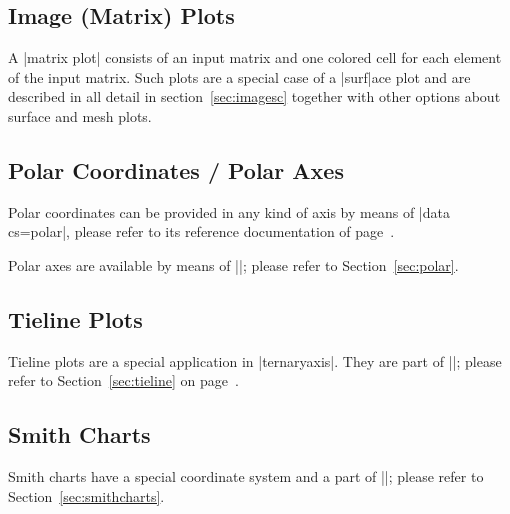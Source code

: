 {\label{sec:pgfplots:2d:patch}

\subsection{Image (Matrix) Plots}

A |matrix plot| consists of an input matrix and one colored cell for each element of the input matrix. Such plots are a special case of a |surf|ace plot and are described in all detail in section~\ref{sec:imagesc} together with other options about surface and mesh plots.


\subsection{Polar Coordinates / Polar Axes}

Polar coordinates can be provided in any kind of axis by means of |data cs=polar|, please refer to its reference documentation of page~\pageref{key:data:cs}.

Polar axes are available by means of ||; please refer to Section~\ref{sec:polar}.

\subsection{Tieline Plots}

Tieline plots are a special application in |ternaryaxis|. They are part of ||; please refer to Section~\ref{sec:tieline} on page~\pageref{sec:tieline}.

\subsection{Smith Charts}

Smith charts have a special coordinate system and a part of ||; please refer to Section~\ref{sec:smithcharts}.

}
